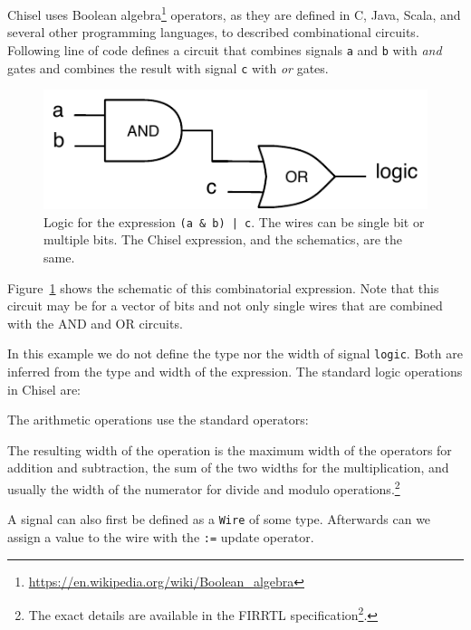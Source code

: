\documentclass[%
    10pt,
    headinclude, footexclude,
    openright, %
    notitlepage,
    cleardoubleempty,
    headsepline,
    pointlessnumbers,
    bibtotoc, idxtotoc,
    ]{scrbook}
\newcommand{\code}[1]{{\small{\texttt{#1}}}}
\newcommand{\scale}{0.7}
\newcommand{\myref}[2]{\href{#1}{#2}}
\renewcommand{\myref}[2]{{#2}{\footnote{\url{#1}}}}
\begin{document}
Chisel uses \myref{https://en.wikipedia.org/wiki/Boolean_algebra}{Boolean algebra} operators,
as they are defined in C, Java, Scala, and several other programming languages,
to described combinational circuits.
Following line of code defines a circuit that combines signals \code{a} and \code{b} with \emph{and}
gates and combines the result with signal \code{c} with \emph{or} gates.


\begin{figure}
  \centering
  \includegraphics[scale=\scale]{figures/logic}
  \caption{Logic for the expression \code{(a \& b) | c}.
  The wires can be single bit or multiple bits. The Chisel expression, and the schematics, are the same.}
  \label{fig:logic}
\end{figure}


Figure~\ref{fig:logic} shows the schematic of this combinatorial expression.
Note that this circuit may be for a vector of bits and not only single wires
that are combined with the AND and OR circuits.

In this example we do not define the type nor the width of signal \code{logic}.
Both are inferred from the type and width of the expression.
The standard logic operations in Chisel are:


\noindent The arithmetic operations use the standard operators:


\noindent The resulting width of the operation is the maximum width of the operators for
addition and subtraction, the sum of the two widths for the multiplication, and usually
the width of the numerator for divide and modulo operations.\footnote{The exact
details are available in the \myref{https://github.com/freechipsproject/firrtl/blob/master/spec/spec.pdf}{FIRRTL specification}.}

A signal can also first be defined as a \code{Wire} of some type. Afterwards can we assign a
value to the wire with the \code{:=} update operator.
\end{document}
